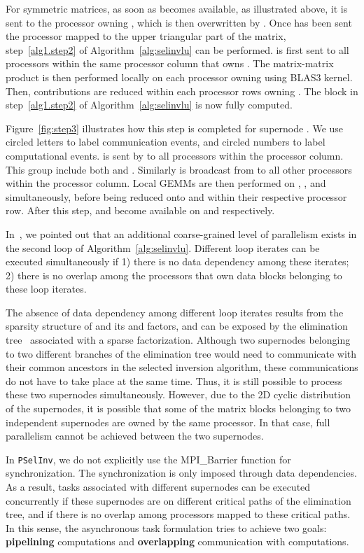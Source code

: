\documentclass{acm_proc_article-sp}
\newcommand{\pselinv}{\texttt{PSelInv}\xspace}
\begin{document}
For symmetric matrices, as soon as  becomes available,
as illustrated above, it is sent to the processor owning
, which is then overwritten by
. 
Once  has been sent the processor
mapped to the upper triangular part of the matrix,
step~\ref{alg1.step2} of Algorithm~\ref{alg:selinvlu} can be performed.
 is first sent to all
processors within the same processor column that owns
.  The matrix-matrix product
 is then performed locally on each
processor owning  using BLAS3 kernel.
Then, contributions  are 
reduced within each processor rows owning . 
The  block in step~\ref{alg1.step2} of
Algorithm~\ref{alg:selinvlu} is now fully computed. 

Figure~\ref{fig:step3} illustrates how this step is completed for 
supernode . We use circled letters
 to label 
communication events, and circled numbers
 to label computational events. 
 is sent by  
to all processors within the processor column.
This group include both  and .  
Similarly  is broadcast from  to all
other processors within the processor column.
Local GEMMs are then performed on 
, ,  and  simultaneously, before being
reduced onto  and  within their respective processor row.
After this step,  and  become available on
 and  respectively.

In~\cite{JacquelinLinYang2014}, we pointed out that an additional 
coarse-grained level of parallelism exists in the second loop 
of Algorithm~\ref{alg:selinvlu}. Different loop iterates can be
executed simultaneously if 1) there is no data dependency among these 
iterates; 2) there is no overlap among the processors that own data blocks
belonging to these loop iterates.

The absence of data dependency among different loop iterates 
results from the sparsity structure of  and its  and  
factors, and can be exposed by the elimination tree~\cite{Liu1990} 
associated with a sparse  factorization. Although two supernodes 
belonging to two different branches of the elimination tree would need 
to communicate with their common ancestors in the selected inversion
algorithm, these communications do not have to take place at the same time.
Thus, it is still possible to process these two supernodes simultaneously.
However, due to the 2D cyclic distribution of the supernodes,
it is possible that some of the matrix blocks belonging to two
independent supernodes are owned by the same processor. In that
case, full parallelism cannot be achieved between the two supernodes.


In \pselinv, we do not explicitly use the MPI\_Barrier function 
for synchronization. The synchronization is only imposed through
data dependencies. As a result, tasks associated with different
supernodes can be executed concurrently if these supernodes are on
different critical paths of the elimination tree, and if there is no
overlap among processors mapped to these critical paths. In this sense,
the asynchronous task formulation tries to achieve two goals:
\textbf{pipelining} computations and \textbf{overlapping} communication
with computations. 
\end{document}
